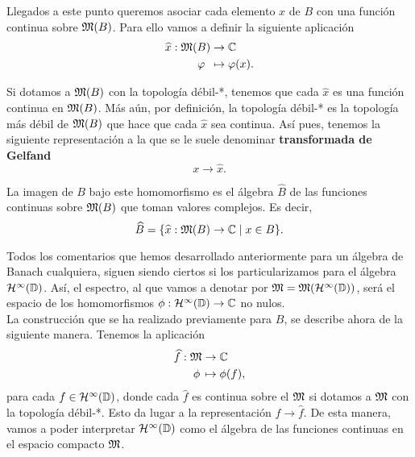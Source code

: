 Llegados a este punto queremos asociar cada elemento $x$ de $B$ con una función continua sobre $\mathfrak{M}(B)$. Para ello vamos a definir la siguiente aplicación
\begin{equation*}
    \begin{split}
        \widehat x:  \mathfrak{M}(B) & \to  \mathbb{C} \\
              \varphi \, \, \, & \mapsto  \varphi (x).
    \end{split}
\end{equation*}

Si dotamos a $\mathfrak{M}(B)$ con la topología débil-*, tenemos que cada $\widehat x$ es una función continua en $\mathfrak{M}(B)$. Más aún, por definición, la topología débil-* es la topología más débil de $\mathfrak{M}(B)$ que hace que cada $\widehat x$ sea continua. Así pues, tenemos la siguiente representación a la que se le suele denominar \textbf{transformada de Gelfand}
\begin{equation*}
    x \to \widehat x.
\end{equation*}

La imagen de $B$ bajo este homomorfismo es el álgebra $\widehat B$ de las funciones continuas sobre $\mathfrak{M}(B)$ que toman valores complejos. Es decir,
\begin{equation*}
    \widehat B = \{\widehat x: \mathfrak{M}(B) \to  \mathbb{C} \mid x \in B\}.
\end{equation*}

\medskip

Todos los comentarios que hemos desarrollado anteriormente para un álgebra de Banach cualquiera, siguen siendo ciertos si los particularizamos para el álgebra $\mathcal{H}^{\infty}(\mathbb{D})$. Así, el espectro, al que vamos a denotar por $\mathfrak{M} = \mathfrak{M} (\mathcal{H}^{\infty}(\mathbb{D}))$, será el espacio de los homomorfismos $\phi: \mathcal{H}^{\infty}(\mathbb{D}) \to \mathbb{C}$ no nulos. \\

La construcción que se ha realizado previamente para $B$, se describe ahora de la siguiente manera. Tenemos la aplicación
\begin{equation*}
    \begin{split}
        \widehat f:  \mathfrak{M} & \to  \mathbb{C} \\
                    \phi \, & \mapsto  \phi (f),
    \end{split}
\end{equation*}
para cada $f \in \mathcal{H}^{\infty}(\mathbb{D})$, donde cada $\widehat f$ es continua sobre el $\mathfrak{M}$ si dotamos a $\mathfrak{M}$ con la topología débil-*. Esto da lugar a la representación $f \to \widehat f$. De esta manera, vamos a poder interpretar $\mathcal{H}^{\infty}(\mathbb{D})$ como el álgebra de las funciones continuas en el espacio compacto $\mathfrak{M}$. \\

